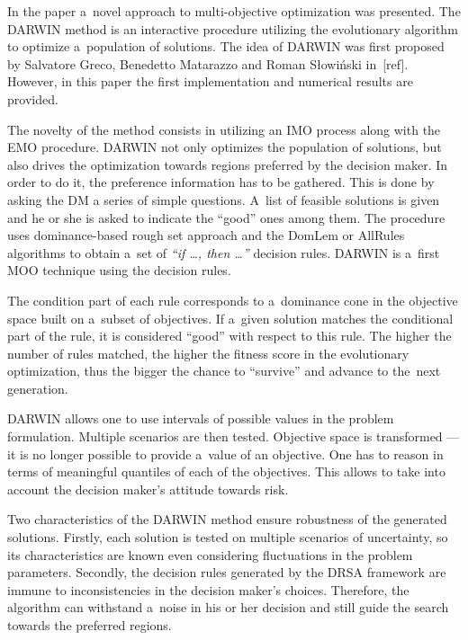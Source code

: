 In the paper a~novel approach to multi-objective optimization was
presented. The DARWIN method is an interactive procedure utilizing the
evolutionary algorithm to optimize a~population of solutions. The idea of
DARWIN was first proposed by Salvatore Greco, Benedetto Matarazzo and Roman
Słowiński in~[ref]. However, in this paper the first implementation and
numerical results are provided.

The novelty of the method consists in utilizing an IMO process along
with the EMO procedure. DARWIN not only optimizes the population of
solutions, but also drives the optimization towards regions preferred
by the decision maker. In order to do it, the preference information
has to be gathered. This is done by asking the DM a series of simple
questions. A~list of feasible solutions is given and he or she is
asked to indicate the ``good'' ones among them. The procedure uses
dominance-based rough set approach and the DomLem or AllRules
algorithms to obtain a~set of \textit{``if \dots, then \dots''}
decision rules. DARWIN is a~first MOO technique using the decision
rules.

The condition part of each rule corresponds to a~dominance cone in the
objective space built on a~subset of objectives. If a~given solution matches
the conditional part of the rule, it is considered ``good'' with respect to
this rule. The higher the number of rules matched, the higher the fitness
score in the evolutionary optimization, thus the bigger the chance to
``survive'' and advance to the~next generation.

DARWIN allows one to use intervals of possible values in the problem
formulation. Multiple scenarios are then tested. Objective space is
transformed --- it is no longer possible to provide a~value of an
objective. One has to reason in terms of meaningful quantiles of each of the
objectives. This allows to take into account the decision maker's attitude
towards risk.

Two characteristics of the DARWIN method ensure robustness of the generated
solutions. Firstly, each solution is tested on multiple scenarios of
uncertainty, so its characteristics are known even considering fluctuations in
the problem parameters. Secondly, the decision rules generated by the DRSA
framework are immune to inconsistencies in the decision maker's
choices. Therefore, the algorithm can withstand a~noise in his or her decision
and still guide the search towards the preferred regions.

